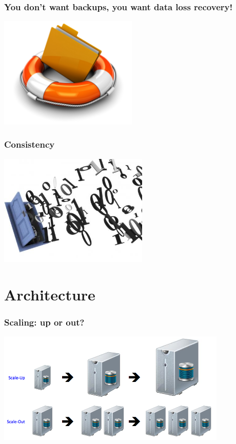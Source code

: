 \documentclass{beamer}
\begin{document}
\begin{frame}
  \frametitle{You don't want backups, you want data loss recovery!}

  \begin{center}
    \includegraphics[height=2.1in]{Data-Recovery-Service-Icon.jpg}
  \end{center}
\end{frame}

\begin{frame}
  \frametitle{Consistency}


  \begin{center}
    \includegraphics[height=2.1in]{bits.jpeg}
  \end{center}
\end{frame}

\section{Architecture}

\begin{frame}
  \frametitle{Scaling: up or out?}

  \begin{center}
    \includegraphics[height=2.1in]{KB_Scale_Out-Up.png}
  \end{center}
\end{frame}
\end{document}
